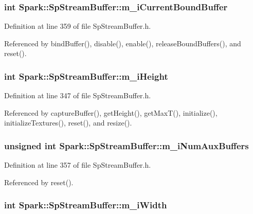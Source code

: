 \subsubsection{\setlength{\rightskip}{0pt plus 5cm}int {\bf Spark::Sp\-Stream\-Buffer::m\_\-i\-Current\-Bound\-Buffer}\hspace{0.3cm}{\tt  [protected]}}\label{classSpark_1_1SpStreamBuffer_p9}


Definition at line 359 of file Sp\-Stream\-Buffer.h.

Referenced by bind\-Buffer(), disable(), enable(), release\-Bound\-Buffers(), and reset().
\subsubsection{\setlength{\rightskip}{0pt plus 5cm}int {\bf Spark::Sp\-Stream\-Buffer::m\_\-i\-Height}\hspace{0.3cm}{\tt  [protected]}}\label{classSpark_1_1SpStreamBuffer_p1}


Definition at line 347 of file Sp\-Stream\-Buffer.h.

Referenced by capture\-Buffer(), get\-Height(), get\-Max\-T(), initialize(), initialize\-Textures(), reset(), and resize().
\subsubsection{\setlength{\rightskip}{0pt plus 5cm}unsigned int {\bf Spark::Sp\-Stream\-Buffer::m\_\-i\-Num\-Aux\-Buffers}\hspace{0.3cm}{\tt  [protected]}}\label{classSpark_1_1SpStreamBuffer_p7}


Definition at line 357 of file Sp\-Stream\-Buffer.h.

Referenced by reset().
\subsubsection{\setlength{\rightskip}{0pt plus 5cm}int {\bf Spark::Sp\-Stream\-Buffer::m\_\-i\-Width}\hspace{0.3cm}{\tt  [protected]}}\label{classSpark_1_1SpStreamBuffer_p0}



